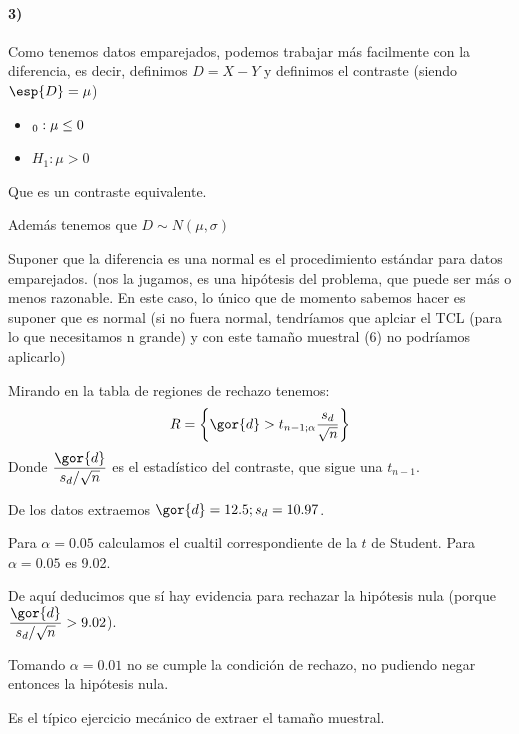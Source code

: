\begin{problem}[6]
\paragraph{3)} Como tenemos datos emparejados, podemos trabajar más facilmente con la diferencia, es decir, definimos $D=X-Y$ y definimos el contraste (siendo $\esp{D}=\mu$)
\begin{itemize}
\item $\Huge_0 : \mu \leq 0$
\item $H_1: \mu >0$
\end{itemize}

Que es un contraste equivalente.

Además tenemos que $D \sim N(\mu,\sigma)$ 

Suponer que la diferencia es una normal es el procedimiento estándar para datos emparejados. (nos la jugamos, es una hipótesis del problema, que puede ser más o menos razonable. En este caso, lo único que de momento sabemos hacer es suponer que es normal (si no fuera normal, tendríamos que aplciar el TCL (para lo que necesitamos n grande) y con este tamaño muestral (6) no podríamos aplicarlo)

Mirando en la tabla de regiones de rechazo tenemos:
\[R = \left\{\gor{d}> t_{n-1;\alpha} \frac{s_d}{\sqrt{n}}\right\}\]
Donde $\displaystyle \frac{\gor{d}}{s_d/\sqrt{n}}$ es el estadístico del contraste, que sigue una $t_{n-1}$.

De los datos extraemos $\gor{d} = 12.5;s_d=10.97$.

Para $\alpha = 0.05$ calculamos el cualtil correspondiente de la $t$ de Student. Para $\alpha = 0.05$ es 9.02.

De aquí deducimos que sí hay evidencia para rechazar la hipótesis nula (porque  $\displaystyle \frac{\gor{d}}{s_d/\sqrt{n}} > 9.02$).

\spart Tomando $\alpha = 0.01$ no se cumple la condición de rechazo, no pudiendo negar entonces la hipótesis nula.

\spart Es el típico ejercicio mecánico de extraer el tamaño muestral. %
\end{problem}



